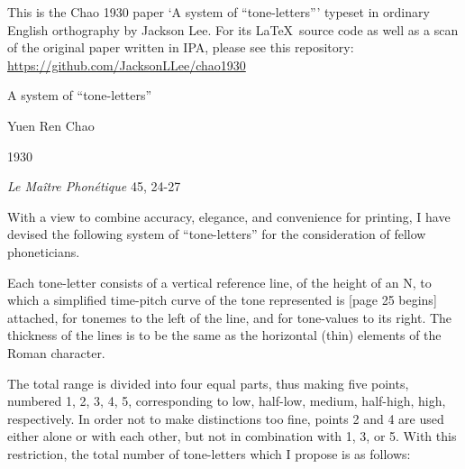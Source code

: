 \documentclass{article}
\begin{document}
\begin{framed}

This is the Chao 1930 paper `A system of ``tone-letters''' typeset in ordinary English orthography by Jackson Lee. For its \LaTeX\ source code as well as a scan of the original paper written in IPA, please see this repository: \\
\url{https://github.com/JacksonLLee/chao1930}

\end{framed}

\begin{center}

A system of ``tone-letters''

Yuen Ren Chao

1930

{\em Le Ma\^itre Phon\'etique} 45, 24-27

\end{center}


With a view to combine accuracy, elegance, and convenience for printing, I have devised the following system of ``tone-letters'' for the consideration of fellow phoneticians.

Each tone-letter consists of a vertical reference line, of the height of an N, to which a simplified time-pitch curve of the tone represented is [page 25 begins] attached, for tonemes to the left of the line, and for tone-values to its right. The thickness of the lines is to be the same as the horizontal (thin) elements of the Roman character.

The total range is divided into four equal parts, thus making five points, numbered 1, 2, 3, 4, 5, corresponding to low, half-low, medium, half-high, high, respectively. In order not to make distinctions too fine, points 2 and 4 are used either alone or with each other, but not in combination with 1, 3, or 5. With this restriction, the total number of tone-letters which I propose is as follows:
\end{document}
